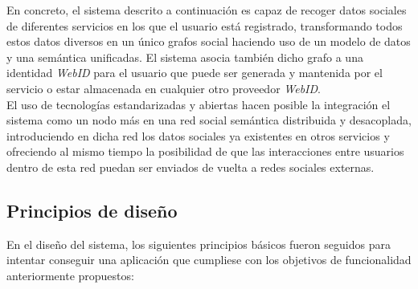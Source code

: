 En concreto, el sistema descrito a continuaci\'on es capaz de recoger datos sociales de diferentes servicios en los que el usuario est\'a registrado, transformando todos estos datos diversos en un \'unico grafos social haciendo uso de un modelo de datos y una sem\'antica unificadas. El sistema asocia tambi\'en dicho grafo a una identidad \textit{WebID} para el usuario que puede ser generada y mantenida por el servicio o estar almacenada en cualquier otro proveedor \textit{WebID}.\\
El uso de tecnolog\'ias estandarizadas y abiertas hacen posible la integraci\'on el sistema como un nodo m\'as en una red social sem\'antica distribuida y desacoplada, introduciendo en dicha red los datos sociales ya existentes en otros servicios y ofreciendo al mismo tiempo la posibilidad de que las interacciones entre usuarios dentro de esta red puedan ser enviados de vuelta a redes sociales externas.

\subsection{Principios de dise\~no}

En el dise\~no del sistema, los siguientes principios b\'asicos fueron seguidos para intentar conseguir una aplicaci\'on que cumpliese con los objetivos de funcionalidad anteriormente propuestos:

